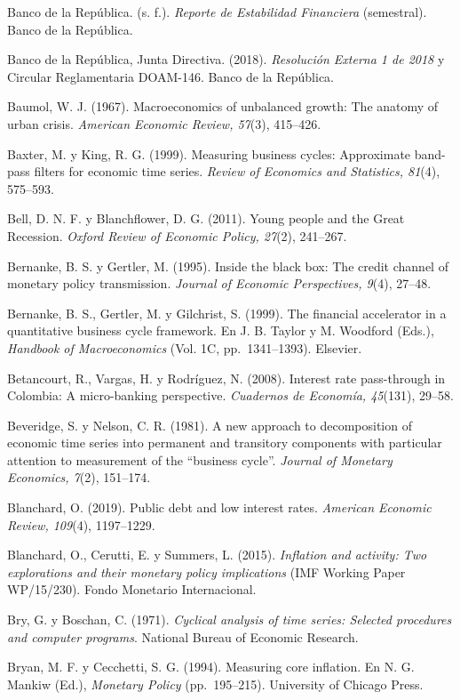 Banco de la República. (s. f.). \emph{Reporte de Estabilidad Financiera}
(semestral). Banco de la República.

Banco de la República, Junta Directiva. (2018). \emph{Resolución Externa
1 de 2018} y Circular Reglamentaria DOAM-146. Banco de la República.

Baumol, W. J. (1967). Macroeconomics of unbalanced growth: The anatomy
of urban crisis. \emph{American Economic Review, 57}(3), 415--426.

Baxter, M. y King, R. G. (1999). Measuring business cycles: Approximate
band-pass filters for economic time series. \emph{Review of Economics
and Statistics, 81}(4), 575--593.

Bell, D. N. F. y Blanchflower, D. G. (2011). Young people and the Great
Recession. \emph{Oxford Review of Economic Policy, 27}(2), 241--267.

Bernanke, B. S. y Gertler, M. (1995). Inside the black box: The credit
channel of monetary policy transmission. \emph{Journal of Economic
Perspectives, 9}(4), 27--48.

Bernanke, B. S., Gertler, M. y Gilchrist, S. (1999). The financial
accelerator in a quantitative business cycle framework. En J. B. Taylor
y M. Woodford (Eds.), \emph{Handbook of Macroeconomics} (Vol. 1C,
pp.~1341--1393). Elsevier.

Betancourt, R., Vargas, H. y Rodríguez, N. (2008). Interest rate
pass-through in Colombia: A micro-banking perspective. \emph{Cuadernos
de Economía, 45}(131), 29--58.

Beveridge, S. y Nelson, C. R. (1981). A new approach to decomposition of
economic time series into permanent and transitory components with
particular attention to measurement of the ``business cycle''.
\emph{Journal of Monetary Economics, 7}(2), 151--174.

Blanchard, O. (2019). Public debt and low interest rates. \emph{American
Economic Review, 109}(4), 1197--1229.

Blanchard, O., Cerutti, E. y Summers, L. (2015). \emph{Inflation and
activity: Two explorations and their monetary policy implications} (IMF
Working Paper WP/15/230). Fondo Monetario Internacional.

Bry, G. y Boschan, C. (1971). \emph{Cyclical analysis of time series:
Selected procedures and computer programs}. National Bureau of Economic
Research.

Bryan, M. F. y Cecchetti, S. G. (1994). Measuring core inflation. En N.
G. Mankiw (Ed.), \emph{Monetary Policy} (pp.~195--215). University of
Chicago Press.

